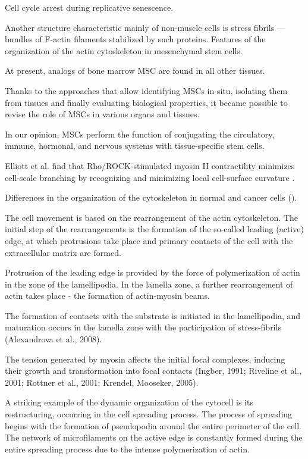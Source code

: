 \documentclass[alpha-refs]{wiley-article}
\begin{document}
Cell cycle arrest during replicative senescence.



Another structure characteristic mainly of non-muscle cells is stress fibrils — bundles of F-actin filaments stabilized by such proteins.
Features of the organization of the actin cytoskeleton in mesenchymal stem cells.

At present, analogs of bone marrow MSC are found in all other tissues.

Thanks to the approaches that allow identifying MSCs in situ, isolating them from tissues and finally evaluating biological properties, it became possible to revise the role of MSCs in various organs and tissues.

In our opinion, MSCs perform the function of conjugating the circulatory, immune, hormonal, and nervous systems with tissue-specific stem cells.


Elliott et al. find that Rho/ROCK-stimulated myosin II contractility minimizes cell-scale branching by recognizing and minimizing local cell-surface curvature \cite{elliott2015myosin}.

Differences in the organization of the cytoskeleton in normal and cancer cells (\cite{shutova2010normal}).

The cell movement is based on the rearrangement of the actin cytoskeleton. The initial step of the rearrangements is the formation of the so-called leading (active) edge, at which protrusions take place and primary contacts of the cell with the extracellular matrix are formed.


Protrusion of the leading edge is provided by the force of polymerization of actin in the zone of the lamellipodia. In the lamella zone, a further rearrangement of actin takes place - the formation of actin-myosin beams.

The formation of contacts with the substrate is initiated in the lamellipodia, and maturation occurs in the lamella zone with the participation of stress-fibrils (Alexandrova et al., 2008).


The tension generated by myosin affects the initial focal complexes, inducing their growth and transformation into focal contacts (Ingber, 1991; Riveline et al., 2001; Rottner et al., 2001; Krendel, Mooseker, 2005).

A striking example of the dynamic organization of the cytocell is its restructuring, occurring in the cell spreading process.
The process of spreading begins with the formation of pseudopodia around the entire perimeter of the cell.
The network of microfilaments on the active edge is constantly formed during the entire spreading process due to the intense polymerization of actin.
\end{document}
